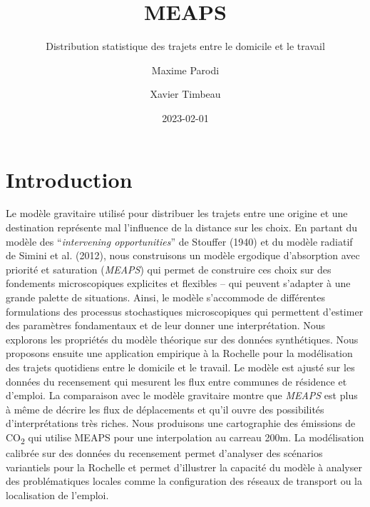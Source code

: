 \documentclass[
  10pt,
  a4paper,
  numbers=noendperiod,
  DIV=9]{scrartcl}
\title{MEAPS}
\subtitle{Distribution statistique des trajets entre le domicile et le
travail}
\author{Maxime Parodi \and Xavier Timbeau}
\date{2023-02-01}
\renewcommand*\contentsname{Table des matières}
\newcommand\contentsname{Table des matières}
\begin{document}
\maketitle
\ifdefined\Shaded\renewenvironment{Shaded}{\begin{tcolorbox}[interior hidden, breakable, sharp corners, boxrule=0pt, enhanced, borderline west={3pt}{0pt}{shadecolor}, frame hidden]}{\end{tcolorbox}}\fi

\renewcommand*\contentsname{Table des matières}
{
\hypersetup{linkcolor=}
\setcounter{tocdepth}{0}
\tableofcontents
}

\hypertarget{introduction}{%
\chapter*{Introduction}\label{introduction}}


Le modèle gravitaire utilisé pour distribuer les trajets entre une
origine et une destination représente mal l'influence de la distance sur
les choix. En partant du modèle des ``\emph{intervening opportunities}''
de Stouffer (1940) et du modèle radiatif de Simini et al. (2012), nous
construisons un modèle ergodique d'absorption avec priorité et
saturation (\emph{MEAPS}) qui permet de construire ces choix sur des
fondements microscopiques explicites et flexibles -- qui peuvent
s'adapter à une grande palette de situations. Ainsi, le modèle
s'accommode de différentes formulations des processus stochastiques
microscopiques qui permettent d'estimer des paramètres fondamentaux et
de leur donner une interprétation. Nous explorons les propriétés du
modèle théorique sur des données synthétiques. Nous proposons ensuite
une application empirique à la Rochelle pour la modélisation des trajets
quotidiens entre le domicile et le travail. Le modèle est ajusté sur les
données du recensement qui mesurent les flux entre communes de résidence
et d'emploi. La comparaison avec le modèle gravitaire montre que
\emph{MEAPS} est plus à même de décrire les flux de déplacements et
qu'il ouvre des possibilités d'interprétations très riches. Nous
produisons une cartographie des émissions de CO\textsubscript{2} qui
utilise MEAPS pour une interpolation au carreau 200m. La modélisation
calibrée sur des données du recensement permet d'analyser des scénarios
variantiels pour la Rochelle et permet d'illustrer la capacité du modèle
à analyser des problématiques locales comme la configuration des réseaux
de transport ou la localisation de l'emploi.
\end{document}
